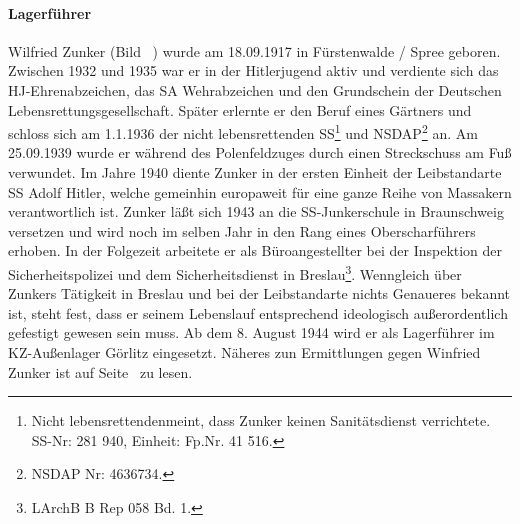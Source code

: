 \documentclass[a4paper,12pt,ngerman,
]{nisebook}
\begin{document}
\paragraph{Lagerführer}
Wilfried Zunker (Bild ~) wurde am 18.09.1917 in Fürstenwalde / Spree geboren. Zwischen 1932 und 1935 war er in der Hitlerjugend aktiv und verdiente sich das HJ-Ehren\-ab\-zei\-chen, das SA Wehrabzeichen und den Grundschein der Deutschen Lebensrettungsgesellschaft. Später erlernte er den Beruf eines Gärtners und schloss sich am 1.1.1936 der \glqq nicht lebensrettenden SS\grqq\footnote{\glqq Nicht lebensrettenden\grqq meint, dass Zunker keinen Sanitätsdienst verrichtete. SS-Nr: 281 940, Einheit: Fp.Nr. 41 516.} und NSDAP\footnote{NSDAP Nr: 4636734.} an.
\newline
Am 25.09.1939 wurde er während des Polenfeldzuges durch einen Streckschuss am Fuß verwundet.
Im Jahre 1940 diente Zunker in der ersten Einheit der \glqq Leibstandarte SS Adolf Hitler\grqq, welche gemeinhin europaweit für eine ganze Reihe von Massakern verantwortlich ist. Zunker läßt sich 1943 an die SS-Junkerschule in Braunschweig versetzen und wird noch im selben Jahr in den Rang eines Oberscharführers erhoben. In der Folgezeit arbeitete er als Büroangestellter bei der Inspektion der Sicherheitspolizei und dem Sicherheitsdienst in Breslau\footnote{LArchB B Rep 058 Bd. 1.}.
\newline
Wenngleich über Zunkers Tätigkeit in Breslau und bei der Leibstandarte nichts Genaueres bekannt ist, steht fest, dass er seinem Lebenslauf entsprechend ideologisch außerordentlich gefestigt gewesen sein muss. Ab dem 8. August 1944 wird er als Lagerführer im KZ-Außenlager Görlitz eingesetzt. Näheres zun Ermittlungen gegen Winfried Zunker ist auf Seite~\pageref{zunker_ahndung} zu lesen.
~\newline

\label{zunkerfoto}
\begin{minipage}[b]{.47\linewidth}
\end{minipage}
\hspace{20pt}
\begin{minipage}[b]{.47\linewidth}
\end{minipage}
\vspace{-25pt}
\end{document}
